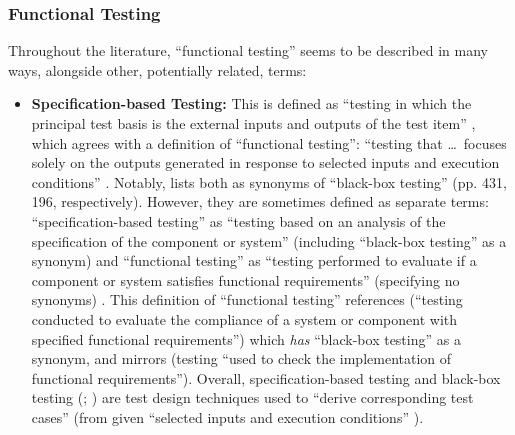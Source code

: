 
\subsubsection{Functional Testing}

Throughout the literature, ``functional testing'' seems to be described in many
ways, alongside other, potentially related, terms:

\begin{itemize}
      \item \textbf{Specification-based Testing:} This is defined as ``testing
            in which the principal test basis is the external inputs and
            outputs of the test item'' \citep[p.~9]{IEEE2022}, which agrees
            with a definition of ``functional testing'': ``testing that
            \dots\ focuses solely on the outputs generated in response to
            selected inputs and execution conditions'' \citep[p.~196]{IEEE2017}.
            Notably, \citet{IEEE2017} lists both as synonyms of
            ``black-box testing'' (pp. 431, 196, respectively). However,
            they are sometimes defined as separate terms: ``specification-based
            testing'' as ``testing based on an analysis of the specification
            of the component or system'' (including ``black-box testing'' as a
            synonym) and ``functional testing'' as ``testing performed to
            evaluate if a component or system satisfies functional
            requirements'' (specifying no synonyms) . This
            definition of
            ``functional testing'' references \citet[p.~196]{IEEE2017}
            (``testing conducted to evaluate the compliance of a system or
            component with specified functional requirements'') which
            \emph{has} ``black-box testing'' as a synonym, and mirrors
            \citet[p.~21]{IEEE2022} (testing ``used to check the implementation
            of functional requirements''). Overall, specification-based testing
            \citep[pp.~2-4,~6-9,~22]{IEEE2022} and black-box testing
            (\citealp[p.~5-10]{SWEBOK2024}; \citealp[p.~3]{SouzaEtAl2017})
            are test design techniques used to ``derive corresponding test cases''
            \citep[p.~11]{IEEE2022} (from given ``selected inputs and execution
            conditions'' \citep[p.~196]{IEEE2017}).


\end{itemize}
